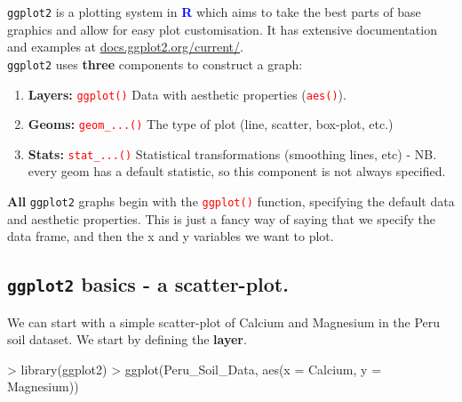 \documentclass[a4paper,12pt]{article}
\newcommand\boldblue[1]{\textcolor{blue}{\textbf{#1}}}
\newcommand\code[1]{\textcolor{red}{\texttt{#1}}}
\begin{document}
\texttt{ggplot2} is a plotting system in \boldblue{R} which aims to take the best parts of base graphics and allow for easy plot customisation. It has extensive documentation and examples at \url{docs.ggplot2.org/current/}. \\


\texttt{ggplot2} uses \textbf{three} components to construct a graph:

\begin{enumerate}
\item \textbf{Layers:} \code{ggplot()} Data with aesthetic properties (\code{aes()}).
\item \textbf{Geoms:} \code{geom\_...()} The type of plot (line, scatter, box-plot, etc.)
\item \textbf{Stats:} \code{stat\_...()} Statistical transformations (smoothing lines, etc) - NB. every geom has a default statistic, so this component is not always specified.
\end{enumerate}

\textbf{All} \texttt{ggplot2} graphs begin with the \code{ggplot()} function, specifying the default data and aesthetic properties. This is just a fancy way of saying that we specify the data frame, and then the x and y variables we want to plot.

\subsection{\texttt{ggplot2} basics - a scatter-plot.}

We can start with a simple scatter-plot of Calcium and Magnesium in the Peru soil dataset. We start by defining the \textbf{layer}.



\begin{shaded}
\begin{Schunk}
\begin{Sinput}
> library(ggplot2)
> ggplot(Peru_Soil_Data, aes(x = Calcium, y = Magnesium))
\end{Sinput}
\end{Schunk}
\end{shaded}
\end{document}
